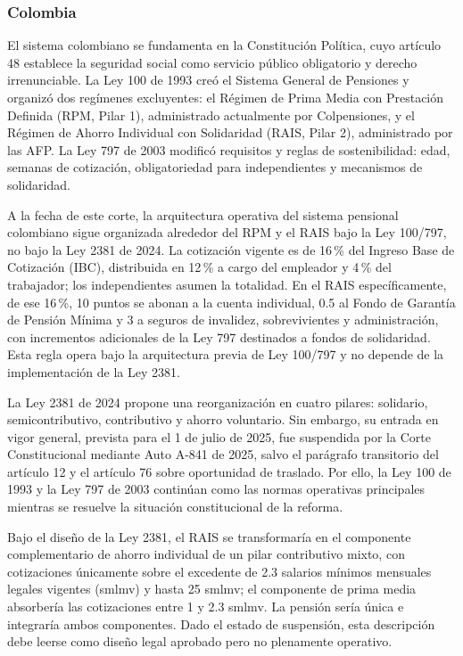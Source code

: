 \documentclass[12pt, letterpaper]{article}
\begin{document}
\subsubsection{Colombia}

El sistema colombiano se fundamenta en la Constitución Política, cuyo artículo 48 establece la seguridad social como servicio público obligatorio y derecho irrenunciable. La Ley 100 de 1993 creó el Sistema General de Pensiones y organizó dos regímenes excluyentes: el Régimen de Prima Media con Prestación Definida (RPM, Pilar 1), administrado actualmente por Colpensiones, y el Régimen de Ahorro Individual con Solidaridad (RAIS, Pilar 2), administrado por las AFP. La Ley 797 de 2003 modificó requisitos y reglas de sostenibilidad: edad, semanas de cotización, obligatoriedad para independientes y mecanismos de solidaridad.

A la fecha de este corte, la arquitectura operativa del sistema pensional colombiano sigue organizada alrededor del RPM y el RAIS bajo la Ley 100/797, no bajo la Ley 2381 de 2024. La cotización vigente es de 16\,\% del Ingreso Base de Cotización (IBC), distribuida en 12\,\% a cargo del empleador y 4\,\% del trabajador; los independientes asumen la totalidad. En el RAIS específicamente, de ese 16\,\%, 10 puntos se abonan a la cuenta individual, 0.5 al Fondo de Garantía de Pensión Mínima y 3 a seguros de invalidez, sobrevivientes y administración, con incrementos adicionales de la Ley 797 destinados a fondos de solidaridad. Esta regla opera bajo la arquitectura previa de Ley 100/797 y no depende de la implementación de la Ley 2381.

La Ley 2381 de 2024 propone una reorganización en cuatro pilares: solidario, semicontributivo, contributivo y ahorro voluntario. Sin embargo, su entrada en vigor general, prevista para el 1 de julio de 2025, fue suspendida por la Corte Constitucional mediante Auto A-841 de 2025, salvo el parágrafo transitorio del artículo 12 y el artículo 76 sobre oportunidad de traslado. Por ello, la Ley 100 de 1993 y la Ley 797 de 2003 continúan como las normas operativas principales mientras se resuelve la situación constitucional de la reforma.

Bajo el diseño de la Ley 2381, el RAIS se transformaría en el componente complementario de ahorro individual de un pilar contributivo mixto, con cotizaciones únicamente sobre el excedente de 2.3 salarios mínimos mensuales legales vigentes (smlmv) y hasta 25 smlmv; el componente de prima media absorbería las cotizaciones entre 1 y 2.3 smlmv. La pensión sería única e integraría ambos componentes. Dado el estado de suspensión, esta descripción debe leerse como diseño legal aprobado pero no plenamente operativo.
\end{document}
